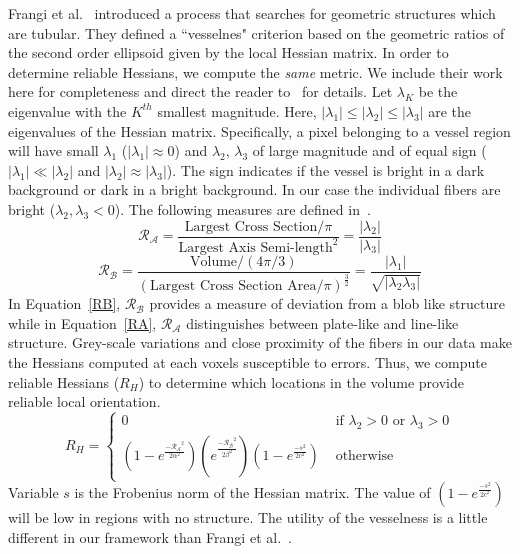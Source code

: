 Frangi et al.~\cite{Frangi1998} introduced a process that searches for geometric structures which are tubular. They defined 
a ``vesselnes" criterion based on the geometric ratios of the second order ellipsoid given by the local Hessian matrix.
In order to determine reliable Hessians, we compute the \textit{same} metric. We include their work here for completeness and direct the reader to~\cite{Frangi1998} for details. Let $\lambda_{K}$ be the eigenvalue with the $K^{th}$ smallest magnitude. Here, $|{\lambda}_{1}| \leq| {\lambda}_{2}|\leq| {\lambda}_{3}| $ are the eigenvalues of the Hessian matrix. Specifically, a pixel belonging to a vessel region will have small $\lambda_{1}$ ($|\lambda_{1}|\approx 0$) and $\lambda_{2}$, $\lambda_{3}$ of large magnitude and of equal sign ($|\lambda_{1}| \ll |\lambda_{2}|$ and $|\lambda_{2}|\approx |\lambda_{3}|$). The sign indicates if the vessel is bright in a dark background or dark in a bright background. In our case the individual fibers are bright ($\lambda_2,\lambda_3 < 0$). The following measures are defined in~\cite{Frangi1998}.  
\begin{equation}\label{RA}
\mathcal{R_{A}}=\frac{\textrm{Largest  Cross Section}\big/ \pi}{{\textrm{Largest Axis Semi-length}}^{2}}=\frac{|\lambda_{2}|}{|\lambda_{3}|}
\end{equation}
\begin{equation}\label{RB}
\mathcal{R_{B}}=\frac{\textrm{Volume}\big/ (4\pi \big/ 3)}{{(\textrm{Largest Cross Section Area}\big/ \pi)}^{\frac{3}{2}}}=\frac{|\lambda_{1}|}{\sqrt{|\lambda_{2}\lambda_{3}|}}
\end{equation}
In Equation~\ref{RB}, $\mathcal{R_{B}}$ provides a measure of deviation from a blob like structure while in Equation~\ref{RA}, $\mathcal{R_{A}}$ distinguishes between plate-like and line-like structure. Grey-scale variations and close proximity of the fibers in our data make the Hessians computed at each voxels susceptible to errors. Thus, we compute reliable Hessians ($R_H$) to determine which locations in the volume provide reliable local orientation. 
$$
R_{H} = \left\{ \begin{array}{ccc}
0 & \mbox{ if $\lambda_{2}>0$ or $\lambda_{3}>0$} \\
(1-e^{\frac{\mathcal{-R_{A}}^{2}}{2\alpha^{2}}})
(e^{\frac{\mathcal{-R_{B}}^{2}}{2\beta^{2}}}) (1-e^{\frac{-s^2}{2c^2}}) &\mbox{ otherwise}
\end{array} \right.
$$
Variable $s$ is the Frobenius norm of the Hessian matrix. The value of $(1-e^{\frac{-s^2}{2c^2}})$ will be low in regions with no structure. The utility of the vesselness is a little different in our framework than Frangi et al.~\cite{Frangi1998}.
